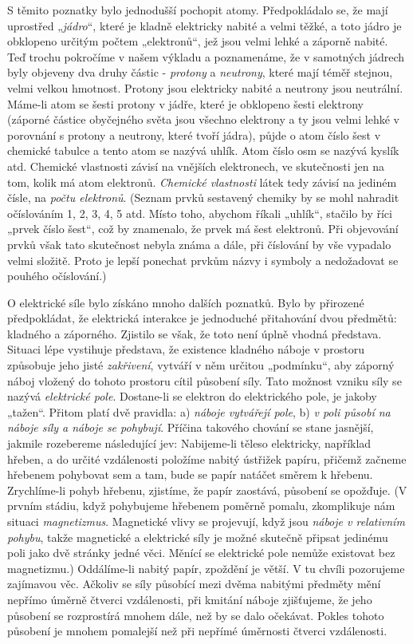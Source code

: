     S těmito poznatky bylo jednodušší pochopit atomy. Předpokládalo se, že mají uprostřed „\emph{jádro}“, 
    které je kladně elektricky nabité a velmi těžké, a toto jádro je obklopeno určitým počtem „elektronů“, 
    jež jsou velmi lehké a záporně nabité. Teď trochu pokročíme v našem výkladu a poznamenáme, že v samotných 
    jádrech byly objeveny dva druhy částic - \emph{protony} a \emph{neutrony}, které mají téměř stejnou, 
    velmi velkou hmotnost. Protony jsou elektricky nabité a neutrony jsou neutrální. Máme-li atom se šesti 
    protony v jádře, které je obklopeno šesti elektrony (záporné částice obyčejného světa jsou všechno 
    elektrony a ty jsou velmi lehké v porovnání s protony a neutrony, které tvoří jádra), půjde o atom číslo 
    šest v chemické tabulce a tento atom se nazývá uhlík. Atom číslo osm se nazývá kyslík atd. Chemické 
    vlastnosti závisí na vnějších elektronech, ve skutečnosti jen na tom, kolik má atom elektronů. 
    \emph{Chemické vlastnosti} látek tedy závisí na jediném čísle, na \emph{počtu elektronů}. (Seznam prvků 
    sestavený chemiky by se mohl nahradit očíslováním 1, 2, 3, 4, 5 atd. Místo toho, abychom říkali „uhlík“, 
    stačilo by říci „prvek číslo šest“, což by znamenalo, že prvek má šest elektronů. Při objevování prvků 
    však tato skutečnost nebyla známa a dále, při číslování by vše vypadalo velmi složitě. Proto je lepší 
    ponechat prvkům názvy i symboly a nedožadovat se pouhého očíslování.)
    
    O elektrické síle bylo získáno mnoho dalších poznatků. Bylo by přirozené předpokládat, že elektrická 
    interakce je jednoduché přitahování dvou předmětů: kladného a záporného. Zjistilo se však, že toto není 
    úplně vhodná představa. Situaci lépe vystihuje představa, že existence kladného náboje v prostoru 
    způsobuje jeho jisté \emph{zakřivení}, vytváří v něm určitou „podmínku“, aby záporný náboj vložený do 
    tohoto prostoru cítil působení síly. Tato možnost vzniku síly se nazývá \emph{elektrické pole}. 
    Dostane-li se elektron do elektrického pole, je jakoby „tažen“. Přitom platí dvě pravidla: a) 
    \emph{náboje vytvářejí pole}, b) \emph{v poli působí na náboje síly a náboje se pohybují}. Příčina 
    takového chování se stane jasnější, jakmile rozebereme následující jev: Nabijeme-li těleso 
    elektricky, například hřeben, a do určité vzdálenosti položíme nabitý ústřižek papíru, přičemž začneme 
    hřebenem pohybovat sem a tam, bude se papír natáčet směrem k hřebenu. Zrychlíme-li pohyb hřebenu, 
    zjistíme, že papír zaostává, působení se opožďuje. (V prvním stádiu, když pohybujeme hřebenem poměrně 
    pomalu, zkomplikuje nám situaci \emph{magnetizmus}. Magnetické vlivy se projevují, když jsou \emph{náboje 
    v relativním pohybu}, takže magnetické a elektrické síly je možné skutečně připsat jedinému poli jako dvě 
    stránky jedné věci. Měnící se elektrické pole nemůže existovat bez magnetizmu.) Oddálíme-li nabitý papír, 
    zpoždění je větší. V tu chvíli pozorujeme zajímavou věc. Ačkoliv se síly působící mezi dvěma nabitými 
    předměty mění nepřímo úměrně čtverci vzdálenosti, při kmitání náboje zjišťujeme, že jeho působení se 
    rozprostírá mnohem dále, než by se dalo očekávat. Pokles tohoto působení je mnohem pomalejší než při 
    nepřímé úměrnosti čtverci vzdálenosti.
    
